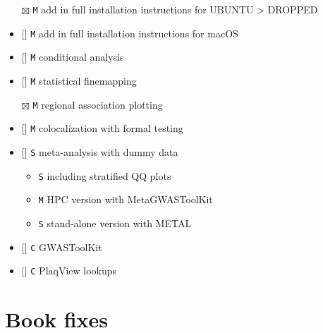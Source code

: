 \documentclass[
]{book}
\newcommand{\passthrough}[1]{#1}
\providecommand{\tightlist}{%
  \setlength{\itemsep}{0pt}\setlength{\parskip}{0pt}}
\begin{document}
\begin{itemize}
\tightlist
\item[$\boxtimes$]
  \passthrough{\lstinline!M!} add in full installation instructions for UBUNTU \textgreater{} DROPPED
\item
  {[}{]} \passthrough{\lstinline!M!} add in full installation instructions for macOS
\item
  {[}{]} \passthrough{\lstinline!M!} conditional analysis
\item
  {[}{]} \passthrough{\lstinline!M!} statistical finemapping
\item[$\boxtimes$]
  \passthrough{\lstinline!M!} regional association plotting
\item
  {[}{]} \passthrough{\lstinline!M!} colocalization with formal testing
\item
  {[}{]} \passthrough{\lstinline!S!} meta-analysis with dummy data

  \begin{itemize}
  \tightlist
  \item
    \passthrough{\lstinline!S!} including stratified QQ plots
  \item
    \passthrough{\lstinline!M!} HPC version with MetaGWASToolKit
  \item
    \passthrough{\lstinline!S!} stand-alone version with METAL
  \end{itemize}
\item
  {[}{]} \passthrough{\lstinline!C!} GWASToolKit
\item
  {[}{]} \passthrough{\lstinline!C!} PlaqView lookups
\end{itemize}

\hypertarget{book-fixes}{%
\section{Book fixes}\label{book-fixes}}
\end{document}
